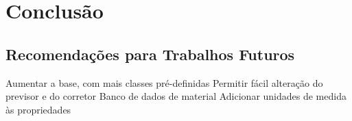 \chapter{Conclusão} \label{ch:conclusion}

\section{Recomendações para Trabalhos Futuros}

\alert{Aumentar a base, com mais classes pré-definidas}
\alert{Permitir fácil alteração do previsor e do corretor}
\alert{Banco de dados de material}
\alert{Adicionar unidades de medida às propriedades}
